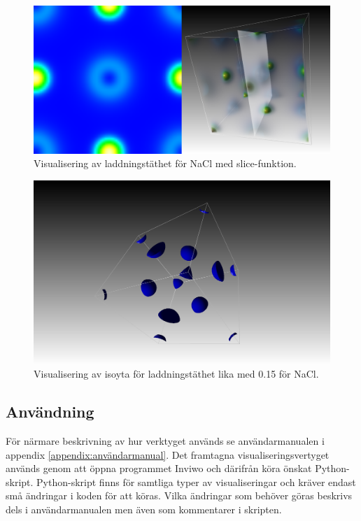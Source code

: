 \documentclass[a4paper,12pt]{article}
\begin{document}
\begin{figure}[H]
	\centering
	\includegraphics[scale=0.15]{NaCl_laddningstathet_slice_visualisering.png}
	\caption{Visualisering av laddningstäthet för NaCl med slice-funktion.}
	\label{fig:visualisering_NaCl_slice}
\end{figure}

\begin{figure}[H]
	\centering
	\includegraphics[scale=0.15]{NaCl_laddningstathet_iso_visualisering.png}
	\caption{Visualisering av isoyta för laddningstäthet lika med 0.15 för NaCl.}
	\label{fig:visualisering_NaCl_iso}
\end{figure}

\subsection{Användning}
För närmare beskrivning av hur verktyget används se användarmanualen i appendix \ref{appendix:användarmanual}. Det framtagna visualiseringsvertyget används genom att öppna programmet Inviwo och därifrån köra önskat Python-skript. Python-skript finns för samtliga typer av visualiseringar och kräver endast små ändringar i koden för att köras. Vilka ändringar som behöver göras beskrivs dels i användarmanualen men även som kommentarer i skripten.
\end{document}
